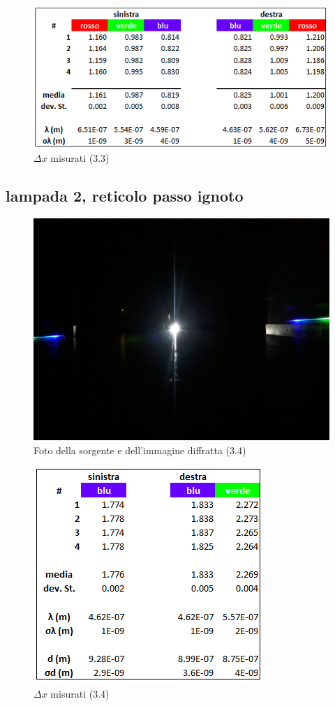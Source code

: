 \documentclass{article}
\begin{document}
\begin{figure}[h!]
  \centering
  \includegraphics[width=0.6\linewidth]{IM tab_2.1}
  \caption{$\Delta x$ misurati (3.3)}
\end{figure}

\clearpage

\subsection{lampada 2, reticolo passo ignoto}

\begin{figure}[h!]
  \centering
  \includegraphics[width=0.6\linewidth]{IM 4.2}
  \caption{Foto della sorgente e dell'immagine diffratta (3.4)}
\end{figure}

\begin{figure}[h!]
  \centering
  \includegraphics[width=0.4\linewidth]{IM tab_2.2}
  \caption{$\Delta x$ misurati (3.4)}
\end{figure}

\clearpage
\end{document}
